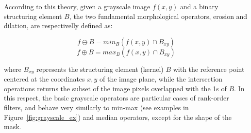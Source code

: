 \documentclass{ieeeaccess}
\begin{document}
According to this theory, given a grayscale image $f(x,y)$ and a binary structuring element $B$, the two fundamental morphological operators, erosion and dilation, are respectivelly defined as:

\begin{equation} \label{eq:erode}
f \ominus B = min_B(f(x,y) \cap B_{xy})
\end{equation}
\vspace{-0.5cm}
\begin{equation} \label{eq:dilate}
f \oplus B = max_B(f(x,y) \cap B_{xy})
\end{equation}

where $B_{xy}$ represents the structuring element (kernel) $B$ with the reference point centered at the coordinates $x,y$ of the image plane, while the intersection operations returns the subset of the image pixels overlapped with the 1s of $B$. In this respect, the basic grayscale operators are particular cases of rank-order filters, and behave very similarly to min-max (see examples in Figure~\ref{fig:grayscale_ex}) and median operators, except for the shape of the mask. 
\end{document}
